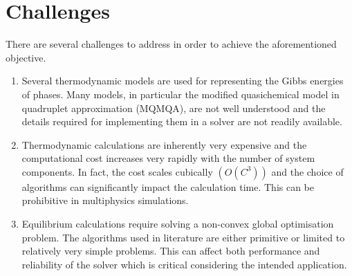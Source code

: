 \section{Challenges}
    There are several challenges to address in order to achieve the aforementioned objective.
    \begin{enumerate}
        \item Several thermodynamic models are used for representing the Gibbs energies of phases. Many models, in particular the modified quasichemical model in quadruplet approximation (MQMQA), are not well understood and the details required for implementing them in a solver are not readily available.
        \item Thermodynamic calculations are inherently very expensive and the computational cost increases very rapidly with the number of system components. In fact, the cost  scales cubically $\left(\mathit{O}(C^3)\right)$ and the choice of algorithms can significantly impact the calculation time. This can be prohibitive in multiphysics simulations.
        \item Equilibrium calculations require solving a non-convex global optimisation problem. The algorithms used in literature are either primitive or limited to relatively very simple problems. This can affect both performance and reliability of the solver which is critical considering the intended application.
        \end{enumerate}


